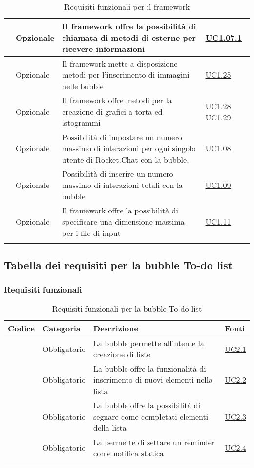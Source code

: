 \begin{longtable}{|P{1.5cm}|P{2.5cm}|P{6.5cm}|P{2.5cm}|}
	\hline \RequisitoOpF\label{L44} & Opzionale & Il framework offre la possibilità di chiamata di metodi di  esterne per ricevere informazioni  & \hyperref[UC1.07.1]{UC1.07.1} \\
	\hline \RequisitoOpF\label{L45} & Opzionale & Il framework mette a disposizione metodi per l'inserimento di immagini nelle bubble
	 & \hyperref[UC1.25]{UC1.25} \\
	\hline \RequisitoOpF\label{L46} & Opzionale & Il framework offre metodi per la creazione di grafici a torta ed istogrammi
	 & \hyperref[UC1.28]{UC1.28} \linebreak \hyperref[UC1.29]{UC1.29}  \\	 
	 \hline \RequisitoOpF\label{L47} & Opzionale & Possibilità di impostare un numero massimo di interazioni per ogni singolo utente di Rocket.Chat con la bubble. & \hyperref[UC1.08]{UC1.08} \\
	 \hline \RequisitoOpF\label{L48} & Opzionale & Possibilità di inserire un numero massimo di interazioni totali con la bubble & \hyperref[UC1.09]{UC1.09} \\
	 \hline \RequisitoOpF\label{L49} & Opzionale & Il framework offre la possibilità di specificare una dimensione massima per i file di input & \hyperref[UC1.11]{UC1.11} \\
	\hline
	\caption{Requisiti funzionali per il framework}
\end{longtable}


\subsection{Tabella dei requisiti per la bubble To-do list}

\subsubsection{Requisiti funzionali}

\begin{longtable}{|P{1.5cm}|P{2.5cm}|P{6.5cm}|P{2.5cm}|}
	\hline \textbf{Codice} & \textbf{Categoria} & \textbf{Descrizione} & \textbf{Fonti} \\
	\hline \RequisitoObF\label{L17} & Obbligatorio & La bubble  permette all'utente la creazione di liste & \hyperref[UC2.1]{UC2.1} \\
	\hline \RequisitoObF\label{L18} & Obbligatorio & La bubble  offre la funzionalità di inserimento di nuovi elementi nella lista & \hyperref[UC2.2]{UC2.2} \\
	\hline \RequisitoObF\label{L19} & Obbligatorio & La bubble  offre la possibilità di segnare come completati elementi della lista & \hyperref[UC2.3]{UC2.3} \\
	\hline \RequisitoObF\label{L20} & Obbligatorio & La  permette di settare un reminder come notifica statica & \hyperref[UC2.4]{UC2.4} \\
	\hline
	\caption{Requisiti funzionali per la bubble To-do list}
\end{longtable}

